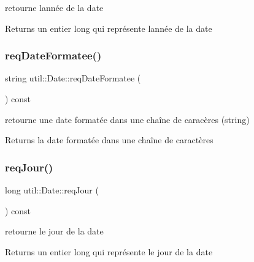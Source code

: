 retourne l\textquotesingle{}année de la date 

\begin{DoxyReturn}{Returns}
un entier long qui représente l\textquotesingle{}année de la date 
\end{DoxyReturn}
\mbox{\label{classutil_1_1Date_ad92d1e9c4d570c5f31a8e06cf2e1ae8c}} 
\subsubsection{\texorpdfstring{req\+Date\+Formatee()}{reqDateFormatee()}}
{\footnotesize\ttfamily string util\+::\+Date\+::req\+Date\+Formatee (\begin{DoxyParamCaption}{ }\end{DoxyParamCaption}) const}



retourne une date formatée dans une chaîne de caracères (string) 

\begin{DoxyReturn}{Returns}
la date formatée dans une chaîne de caractères 
\end{DoxyReturn}
\mbox{\label{classutil_1_1Date_aa2b8c7a6e23e9244a5bac8342484d3b8}} 
\subsubsection{\texorpdfstring{req\+Jour()}{reqJour()}}
{\footnotesize\ttfamily long util\+::\+Date\+::req\+Jour (\begin{DoxyParamCaption}{ }\end{DoxyParamCaption}) const}



retourne le jour de la date 

\begin{DoxyReturn}{Returns}
un entier long qui représente le jour de la date 
\end{DoxyReturn}
\mbox{\label{classutil_1_1Date_a9e76af410b6be9ac4ea9ab4df5797847}} 
